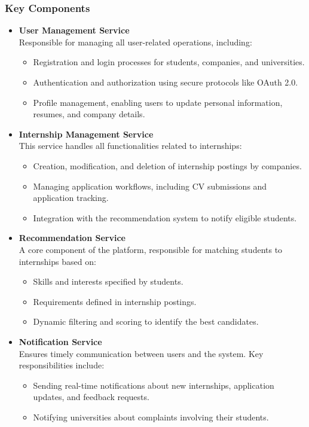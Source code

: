 \documentclass[11pt,twoside]{article}
\begin{document}
\subsubsection{Key Components}
\begin{itemize}
    \item \textbf{User Management Service} \\
    Responsible for managing all user-related operations, including:
    \begin{itemize}
        \item Registration and login processes for students, companies, and universities.
        \item Authentication and authorization using secure protocols like OAuth 2.0.
        \item Profile management, enabling users to update personal information, resumes, and company details.
    \end{itemize}
    
    \item \textbf{Internship Management Service} \\
    This service handles all functionalities related to internships:
    \begin{itemize}
        \item Creation, modification, and deletion of internship postings by companies.
        \item Managing application workflows, including CV submissions and application tracking.
        \item Integration with the recommendation system to notify eligible students.
    \end{itemize}

    \item \textbf{Recommendation Service} \\
    A core component of the platform, responsible for matching students to internships based on:
    \begin{itemize}
        \item Skills and interests specified by students.
        \item Requirements defined in internship postings.
        \item Dynamic filtering and scoring to identify the best candidates.
    \end{itemize}
    
    \item \textbf{Notification Service} \\
    Ensures timely communication between users and the system. Key responsibilities include:
    \begin{itemize}
        \item Sending real-time notifications about new internships, application updates, and feedback requests.
        \item Notifying universities about complaints involving their students.
    \end{itemize}
    

\end{itemize}
\end{document}
